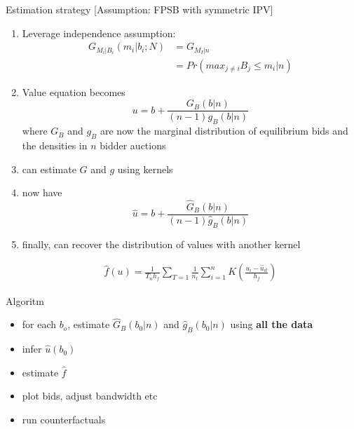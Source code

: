 \begin{frame}[allowframebreaks]{Estimation strategy}
  [Assumption: FPSB with symmetric IPV]

  \begin{enumerate}
    \item Leverage independence assumption: 
    \begin{align*}  
      G_{M_i | B_i}(m_i | b_i; N) &= G_{M_I | n} \\
                                  &= Pr(max_{j\neq i} B_j \leq m_i | n )      
    \end{align*}  
    \item Value equation becomes 
    $$ u = b + \frac{G_B \left(b | n \right)}{ (n-1) g_B \left(b | n \right)} $$
    where $G_B$ and $g_B$ are now the marginal distribution of equilibrium bids and the densities in $n$ bidder auctions

    \framebreak
    
    \item can estimate $G$ and $g$ using kernels 


    \item now have 
    $$ \hat u = b + \frac{\hat G_B \left(b | n \right)}{ (n-1) \hat g_B \left(b | n \right)} $$

    \item finally, can recover the distribution of values with another kernel 
    
    \begin{eqnarray*}
      \hat{f}(u) = \frac{1}{T_nh_f} \sum_{T=1}\frac{1}{n_t}\sum_{i=1}^{n}  K \left( \frac{u_i - \hat u_{it}}{h_f} \right)
    \end{eqnarray*}

  \end{enumerate}

\end{frame}  

\begin{frame}{Algoritm}
\begin{itemize}
   \item for each $b_o$, estimate $\hat G_B(b_0|n)$ and $\hat g_B(b_0|n)$ using \textbf{all the data}
   \item infer $\hat u(b_0)$
   \item estimate $\hat f$ 
   \item plot bids, adjust bandwidth etc 
   \item run counterfactuals 
\end{itemize}
\end{frame}

